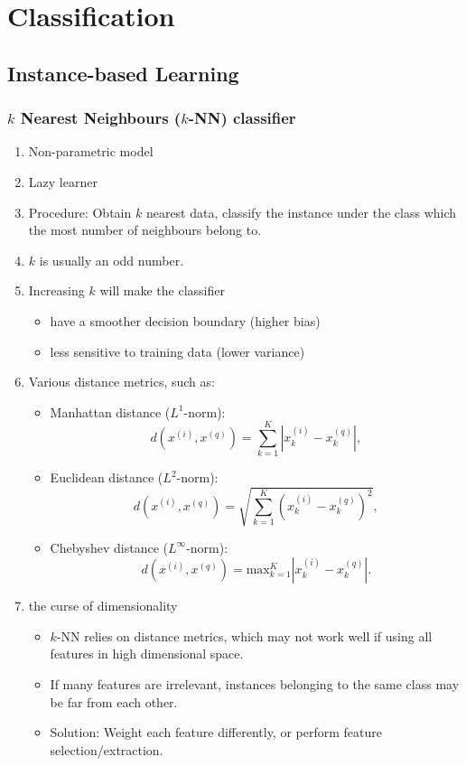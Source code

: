 \documentclass[twocolumn,landscape,10pt]{article}
\theoremstyle{definition}
\begin{document}
\section{Classification}

\subsection{Instance-based Learning}

\subsubsection{$k$ Nearest Neighbours ($k$-NN) classifier}

\begin{enumerate}
    \item Non-parametric model
    \item Lazy learner
    \item Procedure: Obtain $k$ nearest data, classify the instance under the
        class which the most number of neighbours belong to.
    \item $k$ is usually an odd number.
    \item Increasing $k$ will make the classifier
        \begin{itemize}
            \item have a smoother decision boundary (higher bias)
            \item less sensitive to training data (lower variance)
        \end{itemize} 
    \item Various distance metrics, such as:
        \begin{itemize}
            \item Manhattan distance ($L^{1}$-norm):
                \[
                    d(x^{(i)},x^{(q)})=\sum_{k=1}^{K}
                    \left|x_k^{(i)}-x_k^{(q)}\right|,
                \]
            \item Euclidean distance ($L^{2}$-norm):
                \[
                    d(x^{(i)},x^{(q)})=\sqrt{\sum_{k=1}^{K}
                    {\left(x_k^{(i)}-x_k^{(q)}\right)}^{2}},
                \]
            \item Chebyshev distance ($L^{\infty}$-norm):
                \[
                    d(x^{(i)},x^{(q)})=\text{max}_{k=1}^{K}\left|x_k^{(i)}-x_k^{(q)}\right|.
                \]
        \end{itemize} 
    \item the curse of dimensionality
        \begin{itemize}
            \item $k$-NN relies on distance metrics, which may not work well if
                using all features in high dimensional space.
            \item If many features are irrelevant, instances belonging to the
                same class may be far from each other.
            \item Solution: Weight each feature differently, or perform feature
                selection/extraction.
        \end{itemize} 
\end{enumerate} 
\end{document}
